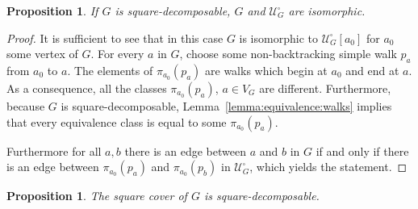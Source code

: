 \documentclass{article}
\newtheorem{proposition}[theorem]{Proposition}
\newcommand\quadcover[1]{\mathcal{U}^\square_{#1}}
\begin{document}
\begin{proposition}\label{proposition.equal.square}
If $G$ is square-decomposable, $G$ and $\quadcover{G}$ are isomorphic.
\end{proposition}

\begin{proof}
It is sufficient to see that in this case $G$ is 
isomorphic to $\quadcover{G}[a_0]$ for $a_0$ some vertex  of $G$. For every $a$ in $G$, choose some non-backtracking simple walk $p_a$ from $a_0$ to $a$. The elements of $\pi_{a_0}(p_a)$ are walks which begin at $a_0$ and end at $a$. As a consequence, all the classes $\pi_{a_0}(p_a)$, $a \in V_G$ are different. Furthermore, because $G$ is square-decomposable, Lemma~\ref{lemma:equivalence:walks} implies that 
every equivalence class is equal to some $\pi_{a_0}(p_a)$. 

Furthermore for all $a,b$ there is an edge between $a$ and $b$ in $G$ if and only if there is an edge between 
$\pi_{a_0}(p_a)$ and $\pi_{a_0}(p_b)$ in $\quadcover{G}$, which yields the statement.
\end{proof}

\begin{proposition}\label{proposition.square.cover.decomposable}
The square cover of $G$ is square-decomposable.
\end{proposition}
\end{document}
